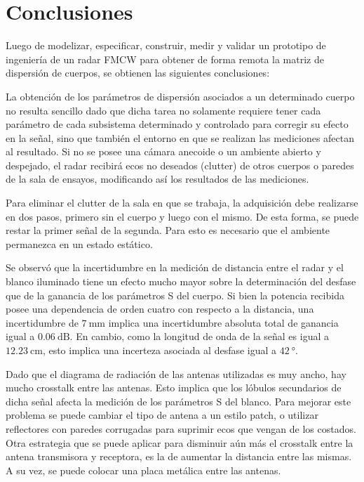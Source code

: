 \chapter{Conclusiones} \label{ch:conclusions}

\ifpdf
    \graphicspath{{Chapter6/Figs/Raster/}{Chapter6/Figs/PDF/}{Chapter6/Figs/}}
\else
    \graphicspath{{Chapter6/Figs/Vector/}{Chapter6/Figs/}}
\fi

Luego de modelizar, especificar, construir, medir y validar un prototipo de ingeniería de un radar FMCW para obtener de forma remota la matriz de dispersión de cuerpos, se obtienen las siguientes conclusiones:

La obtención de los parámetros de dispersión asociados a un determinado cuerpo no resulta sencillo dado que dicha tarea no solamente requiere tener cada parámetro de cada subsistema determinado y controlado para corregir su efecto en la señal, sino que también el entorno en que se realizan las mediciones afectan al resultado. Si no se posee una cámara anecoide o un ambiente abierto y despejado, el radar recibirá ecos no deseados (clutter) de otros cuerpos o paredes de la sala de ensayos, modificando así los resultados de las mediciones.

Para eliminar el clutter de la sala en que se trabaja, la adquisición debe realizarse en dos pasos, primero sin el cuerpo y luego con el mismo. De esta forma, se puede restar la primer señal de la segunda. Para esto es necesario que el ambiente permanezca en un estado estático.

Se observó que la incertidumbre en la medición de distancia entre el radar y el blanco iluminado tiene un efecto mucho mayor sobre la determinación del desfase que de la ganancia de los parámetros S del cuerpo. Si bien la potencia recibida posee una dependencia de orden cuatro con respecto a la distancia, una incertidumbre de $\SI{7}{\milli\meter}$ implica una incertidumbre absoluta total de ganancia igual a $\SI{0.06}{\dB}$. En cambio, como la longitud de onda de la señal es igual a $\SI{12.23}{\centi\meter}$, esto implica una incerteza asociada al desfase igual a $\SI{42}{\degree}$.

Dado que el diagrama de radiación de las antenas utilizadas es muy ancho, hay mucho crosstalk entre las antenas. Esto implica que los lóbulos secundarios de dicha señal afecta la medición de los parámetros S del blanco. Para mejorar este problema se puede cambiar el tipo de antena a un estilo patch, o utilizar reflectores con paredes corrugadas para suprimir ecos que vengan de los costados. Otra estrategia que se puede aplicar para disminuir aún más el crosstalk entre la antena transmisora y receptora, es la de aumentar la distancia entre las mismas. A su vez, se puede colocar una placa metálica entre las antenas.

